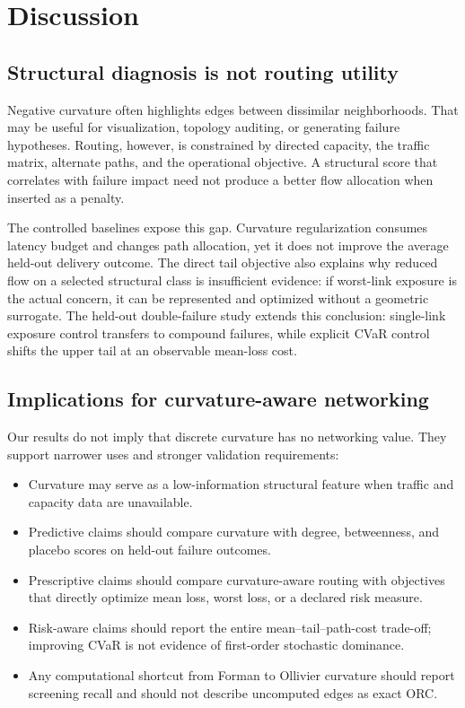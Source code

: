 \documentclass[preprint,12pt]{elsarticle}
\begin{document}
\section{Discussion}

\subsection{Structural diagnosis is not routing utility}

Negative curvature often highlights edges between dissimilar neighborhoods.
That may be useful for visualization, topology auditing, or generating failure
hypotheses. Routing, however, is constrained by directed capacity, the traffic
matrix, alternate paths, and the operational objective. A structural score that
correlates with failure impact need not produce a better flow allocation when
inserted as a penalty.

The controlled baselines expose this gap. Curvature regularization consumes
latency budget and changes path allocation, yet it does not improve the average
held-out delivery outcome. The direct tail objective also explains why reduced
flow on a selected structural class is insufficient evidence: if worst-link
exposure is the actual concern, it can be represented and optimized without a
geometric surrogate. The held-out double-failure study extends this conclusion:
single-link exposure control transfers to compound failures, while explicit
CVaR control shifts the upper tail at an observable mean-loss cost.

\subsection{Implications for curvature-aware networking}

Our results do not imply that discrete curvature has no networking value. They
support narrower uses and stronger validation requirements:

\begin{itemize}
\item Curvature may serve as a low-information structural feature when traffic
and capacity data are unavailable.
\item Predictive claims should compare curvature with degree, betweenness, and
placebo scores on held-out failure outcomes.
\item Prescriptive claims should compare curvature-aware routing with objectives
that directly optimize mean loss, worst loss, or a declared risk measure.
\item Risk-aware claims should report the entire mean--tail--path-cost trade-off;
improving CVaR is not evidence of first-order stochastic dominance.
\item Any computational shortcut from Forman to Ollivier curvature should report
screening recall and should not describe uncomputed edges as exact ORC.
\end{itemize}
\end{document}
